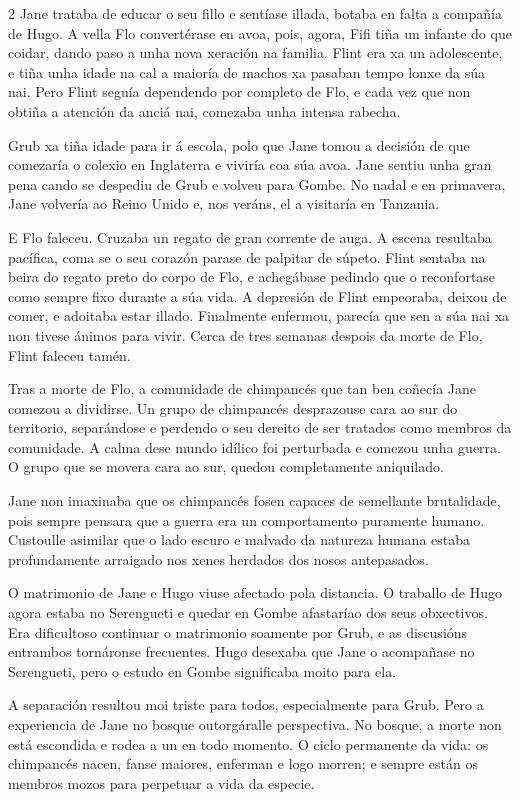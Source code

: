 \begin{multicols}{2}
Jane trataba de educar o seu fillo e sentíase illada, botaba en falta a
compañía de Hugo. A vella Flo convertérase en avoa, pois, agora, Fifi tiña un
infante do que coidar, dando paso a unha nova xeración na familia. Flint era xa
un adolescente, e tiña unha idade na cal a maioría de machos xa pasaban tempo
lonxe da súa nai. Pero Flint seguía dependendo por completo de Flo, e cada vez
que non obtiña a atención da anciá nai, comezaba unha intensa rabecha.

Grub xa tiña idade para ir á escola, polo que Jane tomou a decisión de que
comezaría o colexio en Inglaterra e viviría coa súa avoa. Jane sentiu unha gran
pena cando se despediu de Grub e volveu para Gombe. No nadal e en primavera,
Jane volvería ao Reino Unido e, nos veráns, el a visitaría en Tanzania.

E Flo faleceu. Cruzaba un regato de gran corrente de auga. A escena resultaba
pacífica, coma se o seu corazón parase de palpitar de súpeto. Flint sentaba na
beira do regato preto do corpo de Flo, e achegábase pedindo que o reconfortase
como sempre fixo durante a súa vida. A depresión de Flint empeoraba, deixou de
comer, e adoitaba estar illado. Finalmente enfermou, parecía que sen a súa nai
xa non tivese ánimos para vivir. Cerca de tres semanas despois da morte de Flo,
Flint faleceu tamén.

Tras a morte de Flo, a comunidade de chimpancés que tan ben coñecía Jane
comezou a dividirse. Un grupo de chimpancés desprazouse cara ao sur do
territorio, separándose e perdendo o seu dereito de ser tratados como membros
da comunidade. A calma dese mundo idílico foi perturbada e comezou unha guerra.
O grupo que se movera cara ao sur, quedou completamente aniquilado.

Jane non imaxinaba que os chimpancés fosen capaces de semellante brutalidade,
pois sempre pensara que a guerra era un comportamento puramente humano.
Custoulle asimilar que o lado escuro e malvado da natureza humana estaba
profundamente arraigado nos xenes herdados dos nosos antepasados.

O matrimonio de Jane e Hugo viuse afectado pola distancia. O traballo de Hugo
agora estaba no Serengueti e quedar en Gombe afastaríao dos seus obxectivos.
Era dificultoso continuar o matrimonio soamente por Grub, e as discusións
entrambos tornáronse frecuentes. Hugo desexaba que Jane o acompañase no
Serengueti, pero o estudo en Gombe significaba moito para ela.

A separación resultou moi triste para todos, especialmente para Grub. Pero a
experiencia de Jane no bosque outorgáralle perspectiva. No bosque, a morte non
está escondida e rodea a un en todo momento. O ciclo permanente da vida: os
chimpancés nacen, fanse maiores, enferman e logo morren; e sempre están os
membros mozos para perpetuar a vida da especie.


\end{multicols}
